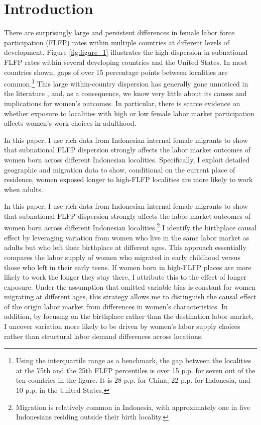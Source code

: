 \section{Introduction}

There are surprisingly large and persistent differences in female labor force participation (FLFP) rates within multiple countries at different levels of development. Figure \ref{fig:figure_1} illustrates the high dispersion in subnational FLFP rates within several developing countries and the United States. In most countries shown, gaps of over 15 percentage points between localities are common.\footnote{Using the interquartile range as a benchmark, the gap between the localities at the 75th and the 25th FLFP percentiles is over 15 p.p. for seven out of the ten countries in the figure. It is 28 p.p. for China, 22 p.p. for Indonesia, and 10 p.p. in the United States.} This large within-country dispersion has generally gone unnoticed in the literature \citep{Charles2018}, and, as a consequence, we know very little about its causes and implications for women's outcomes.  In particular, there is scarce evidence on whether exposure to localities with high or low female labor market participation affects women's work choices in adulthood. %



In this paper, I use rich data from Indonesian internal female migrants to show that subnational FLFP dispersion strongly affects the labor market outcomes of women born across different Indonesian localities. Specifically, I exploit detailed geographic and migration data to show, conditional on the current place of residence,  women exposed longer to high-FLFP localities are more likely to work when adults.

In this paper, I use rich data from Indonesian internal female migrants to show that subnational FLFP dispersion strongly affects the labor market outcomes of women born across different Indonesian localities.\footnote{Migration is relatively common in Indonesia, with approximately one in five Indonesians residing outside their birth locality.} I identify the birthplace causal effect by leveraging variation from women who live in the same labor market as adults but who left their birthplace at different ages. This approach essentially compares the labor supply of women who migrated in early childhood versus those who left in their early teens. If women born in high-FLFP places are more likely to work the longer they stay there, I attribute this to the effect of longer exposure. Under the assumption that omitted variable bias is constant for women migrating at different ages, this strategy allows me to distinguish the causal effect of the origin labor market from differences in women's characteristics.  In addition, by focusing on the birthplace rather than the destination labor market, I uncover variation more likely to be driven by women's labor supply choices rather than structural labor demand differences across locations.


